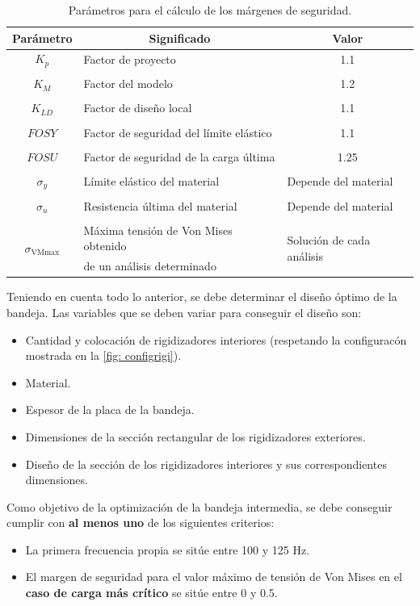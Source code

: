 \begin{table}[H]
\centering
\caption{Parámetros para el cálculo de los márgenes de seguridad.}
\label{tab: paramsequs}
\begin{tabular}{c l c}
\toprule
\multicolumn{1}{c}{\textbf{Parámetro}} & \multicolumn{1}{c}{\textbf{Significado}} & \multicolumn{1}{c}{\textbf{Valor}} \\ \midrule
  $K_{p}$   & Factor de proyecto  & 1.1 \\
  & & \\
  $K_{M}$   & Factor del modelo   & 1.2 \\
  & & \\
  $K_{LD}$  & Factor de diseño local & 1.1 \\ 
  & & \\
  $FOSY$    & Factor de seguridad del límite elástico & 1.1 \\
  & & \\ 
  $FOSU$    & Factor de seguridad de la carga última  & 1.25 \\ 
  & & \\
  $\sigma_{y}$ & Límite elástico del material & \multicolumn{1}{l}{Depende del material} \\
  & & \\ 
  $\sigma_{u}$ & Resistencia última del material & \multicolumn{1}{l}{Depende del material} \\ 
  & & \\
  \multirow{2}{*}{$\sigma_{\text{VMmax}}$ }& Máxima tensión de Von Mises obtenido & \multicolumn{1}{l}{\multirow{2}{*}{Solución de cada análisis}} \\ 
  & de un análisis determinado & \\
\bottomrule
\end{tabular}
\end{table}

Teniendo en cuenta todo lo anterior, se debe determinar el diseño óptimo de la bandeja. Las variables que se deben variar para conseguir el diseño son:

\begin{itemize}
\item Cantidad y colocación de rigidizadores interiores (respetando la configuracón mostrada en la \autoref{fig: configrigi}).
\item Material.
\item Espesor de la placa de la bandeja.
\item Dimensiones de la sección rectangular de los rigidizadores exteriores.
\item Diseño de la sección de los rigidizadores interiores y sus correspondientes dimensiones.
\end{itemize}

Como objetivo de la optimización de la bandeja intermedia, se debe conseguir cumplir con \textbf{al menos uno} de los siguientes criterios:

\begin{itemize}
\item La primera frecuencia propia se sitúe entre 100 y 125 Hz.
\item El margen de seguridad para el valor máximo de tensión de Von Mises en el \textbf{caso de carga más crítico} se sitúe entre 0 y 0.5. 
\end{itemize}